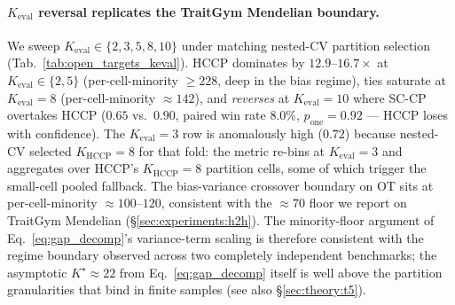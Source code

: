 \paragraph{$K_{\mathrm{eval}}$ reversal replicates the TraitGym Mendelian
boundary.}
We sweep $K_{\mathrm{eval}} \in \{2, 3, 5, 8, 10\}$ under matching
nested-CV partition selection (Tab.~\ref{tab:open_targets_keval}). HCCP
dominates by $12.9$--$16.7\times$ at $K_{\mathrm{eval}} \in \{2, 5\}$
(per-cell-minority $\geq 228$, deep in the bias regime),
ties saturate at $K_{\mathrm{eval}} = 8$ (per-cell-minority $\approx 142$),
and \emph{reverses} at $K_{\mathrm{eval}} = 10$ where SC-CP overtakes HCCP
($0.65$ vs.\ $0.90$, paired win rate $8.0\%$, $p_{\mathrm{one}} = 0.92$ —
HCCP loses with confidence). The $K_{\mathrm{eval}} = 3$ row is anomalously
high ($0.72$) because nested-CV selected $K_{\mathrm{HCCP}} = 8$ for that
fold: the metric re-bins at $K_{\mathrm{eval}} = 3$ and aggregates over
HCCP's $K_{\mathrm{HCCP}} = 8$ partition cells, some of which trigger the
small-cell pooled fallback. The bias-variance crossover boundary on OT
sits at per-cell-minority $\approx 100$--$120$, consistent with the
$\approx 70$ floor we report on TraitGym Mendelian
(\S\ref{sec:experiments:h2h}). The minority-floor argument of
Eq.~\eqref{eq:gap_decomp}'s variance-term scaling is therefore consistent
with the regime boundary observed across two completely independent
benchmarks; the asymptotic $K^\star \approx 22$ from Eq.~\eqref{eq:gap_decomp}
itself is well above the partition granularities that bind in finite samples
(see also \S\ref{sec:theory:t5}).

